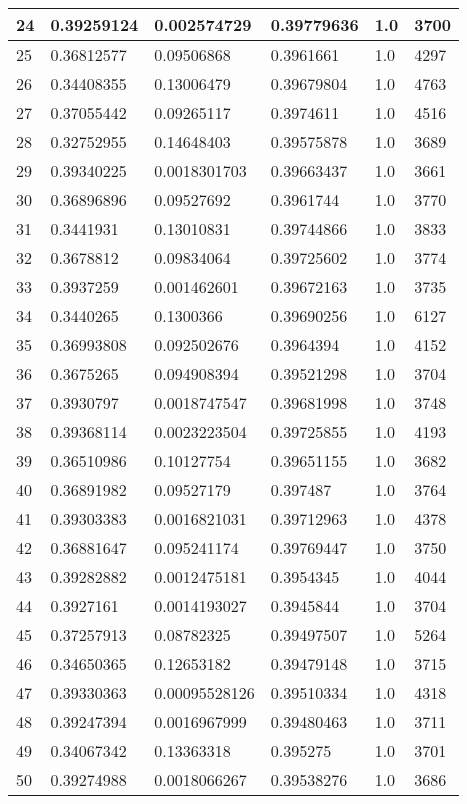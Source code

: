 \begin{longtable}{|l|l|l|l|l|l|}
24 & 0.39259124 & 0.002574729 & 0.39779636 & 1.0 & 3700 \\ \hline 
25 & 0.36812577 & 0.09506868 & 0.3961661 & 1.0 & 4297 \\ \hline 
26 & 0.34408355 & 0.13006479 & 0.39679804 & 1.0 & 4763 \\ \hline 
27 & 0.37055442 & 0.09265117 & 0.3974611 & 1.0 & 4516 \\ \hline 
28 & 0.32752955 & 0.14648403 & 0.39575878 & 1.0 & 3689 \\ \hline 
29 & 0.39340225 & 0.0018301703 & 0.39663437 & 1.0 & 3661 \\ \hline 
30 & 0.36896896 & 0.09527692 & 0.3961744 & 1.0 & 3770 \\ \hline 
31 & 0.3441931 & 0.13010831 & 0.39744866 & 1.0 & 3833 \\ \hline 
32 & 0.3678812 & 0.09834064 & 0.39725602 & 1.0 & 3774 \\ \hline 
33 & 0.3937259 & 0.001462601 & 0.39672163 & 1.0 & 3735 \\ \hline 
34 & 0.3440265 & 0.1300366 & 0.39690256 & 1.0 & 6127 \\ \hline 
35 & 0.36993808 & 0.092502676 & 0.3964394 & 1.0 & 4152 \\ \hline 
36 & 0.3675265 & 0.094908394 & 0.39521298 & 1.0 & 3704 \\ \hline 
37 & 0.3930797 & 0.0018747547 & 0.39681998 & 1.0 & 3748 \\ \hline 
38 & 0.39368114 & 0.0023223504 & 0.39725855 & 1.0 & 4193 \\ \hline 
39 & 0.36510986 & 0.10127754 & 0.39651155 & 1.0 & 3682 \\ \hline 
40 & 0.36891982 & 0.09527179 & 0.397487 & 1.0 & 3764 \\ \hline 
41 & 0.39303383 & 0.0016821031 & 0.39712963 & 1.0 & 4378 \\ \hline 
42 & 0.36881647 & 0.095241174 & 0.39769447 & 1.0 & 3750 \\ \hline 
43 & 0.39282882 & 0.0012475181 & 0.3954345 & 1.0 & 4044 \\ \hline 
44 & 0.3927161 & 0.0014193027 & 0.3945844 & 1.0 & 3704 \\ \hline 
45 & 0.37257913 & 0.08782325 & 0.39497507 & 1.0 & 5264 \\ \hline 
46 & 0.34650365 & 0.12653182 & 0.39479148 & 1.0 & 3715 \\ \hline 
47 & 0.39330363 & 0.00095528126 & 0.39510334 & 1.0 & 4318 \\ \hline 
48 & 0.39247394 & 0.0016967999 & 0.39480463 & 1.0 & 3711 \\ \hline 
49 & 0.34067342 & 0.13363318 & 0.395275 & 1.0 & 3701 \\ \hline 
50 & 0.39274988 & 0.0018066267 & 0.39538276 & 1.0 & 3686 \\ \hline 
\end{longtable}